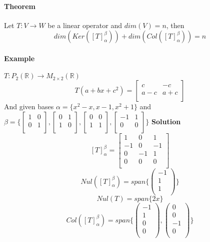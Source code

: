 \documentclass[11pt]{article}
\newcommand{\trans}[3]{{#1}: {#2} \to {#3}}
\begin{document}
	\paragraph{Theorem}  Let $\trans{T}{V}{W}$ be a linear operator and $dim(V) = n$, then
	\[
		dim(Ker([T]_{\alpha}^{\beta})) + dim(Col([T]_{\alpha}^{\beta})) = n
	\]
	
	\paragraph{Example} $T: P_2(\mathbb{R}) \to M_{2 \times 2}(\mathbb{R})$
	\[
	T(a+bx+c^2) = \begin{bmatrix}
		c & -c \\
		a-c & a+c \\
	\end{bmatrix}
	\] And given bases $\alpha = \{x^2-x, x-1, x^2 + 1\}$ and $\beta = \{
	\begin{bmatrix}
		1 & 0 \\
		0 & 1 \\
	\end{bmatrix},
	\begin{bmatrix}
		0 & 1 \\
		1 & 0 \\
	\end{bmatrix},
	\begin{bmatrix}
		0 & 0 \\
		1 & 1 \\
	\end{bmatrix},
	\begin{bmatrix}
		-1 & 1 \\
		0 & 0 \\
	\end{bmatrix}
	\}$
	\textbf{Solution}
	\[
		[T]_{\alpha}^{\beta} = \begin{bmatrix}
			1 & 0 & 1 \\
			-1 & 0 & -1 \\
			0 & -1 & 1 \\
			0 & 0 & 0 \\
		\end{bmatrix}
	\]
	\[
		Nul([T]_{\alpha}^{\beta}) = span\{\begin{pmatrix}
		-1 \\
		1 \\ 
		1 \\	
		\end{pmatrix}
		\}
	\]
	\[
		Nul(T) = span\{2x\}
	\]
	\[
		Col([T]_{\alpha}^{\beta}) = span\{\begin{pmatrix}
		-1 \\
		1 \\
		0 \\
		0 \\	
		\end{pmatrix}, \begin{pmatrix}
			0 \\
			0 \\
			-1 \\
			0 \\
		\end{pmatrix}
		\}
	\]
\end{document}
